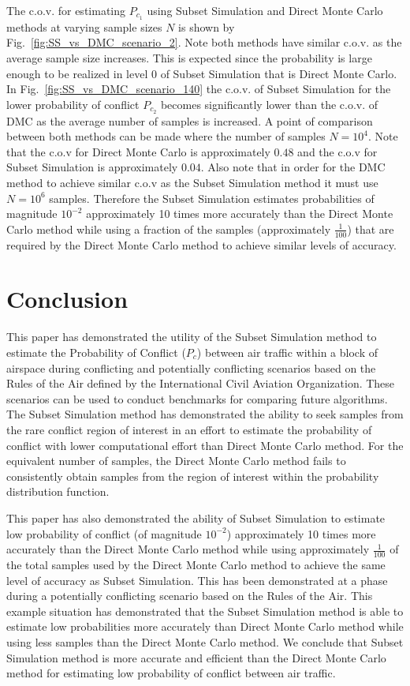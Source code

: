 \documentclass[journal]{IEEEtran}
\begin{document}
The c.o.v. for estimating $P_{c_{1}}$ using Subset Simulation and Direct Monte Carlo methods at varying sample sizes $N$ is shown by Fig.~\ref{fig:SS_vs_DMC_scenario_2}. Note both methods have similar c.o.v. as the average sample size increases. This is expected since the probability is large enough to be realized in level 0 of Subset Simulation that is Direct Monte Carlo. In Fig.~\ref{fig:SS_vs_DMC_scenario_140} the c.o.v. of Subset Simulation for the lower probability of conflict $P_{c_{2}}$ becomes significantly lower than the c.o.v. of DMC as the average number of samples is increased. A point of comparison between both methods can be made where the number of samples $N = 10^{4}$. Note that the c.o.v for Direct Monte Carlo is approximately $0.48$ and the c.o.v for Subset Simulation is approximately $0.04$. Also note that in order for the DMC method to achieve similar c.o.v as the Subset Simulation method it must use $N = 10^{6}$ samples. Therefore the Subset Simulation estimates probabilities of magnitude $10^{-2}$ approximately 10 times more accurately than the Direct Monte Carlo method while using a fraction of the samples (approximately $\frac{1}{100}$) that are required by the Direct Monte Carlo method to achieve similar levels of accuracy. 

\section{Conclusion}
\label{sec:conclusion}

This paper has demonstrated the utility of the Subset Simulation method to estimate the Probability of Conflict ($P_{c}$) between air traffic within a block of airspace during conflicting and potentially conflicting scenarios based on the Rules of the Air defined by the International Civil Aviation Organization. These scenarios can be used to conduct benchmarks for comparing future algorithms. The Subset Simulation method has demonstrated the ability to seek samples from the rare conflict region of interest in an effort to estimate the probability of conflict with lower computational effort than Direct Monte Carlo method. For the equivalent number of samples, the Direct Monte Carlo method fails to consistently obtain samples from the region of interest within the probability distribution function. 

This paper has also demonstrated the ability of Subset Simulation to estimate low probability of conflict (of magnitude $10^{-2}$) approximately 10 times more accurately than the Direct Monte Carlo method while using approximately $\frac{1}{100}$ of the total samples used by the Direct Monte Carlo method to achieve the same level of accuracy as Subset Simulation. This has been demonstrated at a phase during a potentially conflicting scenario based on the Rules of the Air. This example situation has demonstrated that the Subset Simulation method is able to estimate low probabilities more accurately than Direct Monte Carlo method while using less samples than the Direct Monte Carlo method. We conclude that Subset Simulation method is more accurate and efficient than the Direct Monte Carlo method for estimating low probability of conflict between air traffic.  
\end{document}
